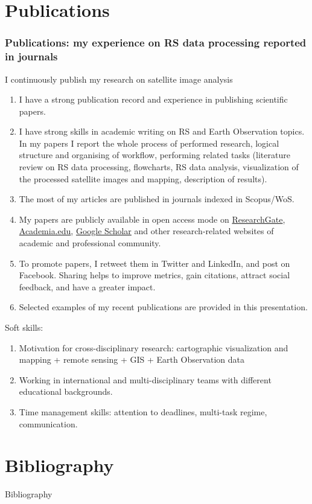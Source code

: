\documentclass[pdflatex,compress,8pt,
	xcolor={dvipsnames,dvipsnames,svgnames,x11names,table},
	hyperref={colorlinks = true,breaklinks = true, urlcolor = NavyBlue, breaklinks = true}]{beamer}
\begin{document}
\section{Publications}
\begin{frame}\frametitle{Publications: my experience on RS data processing reported in journals}

\begin{alertblock}{I continuously publish my research on satellite image analysis}
\small{\begin{enumerate}[\ding{213}]
	\item I have a strong publication record and experience in publishing scientific papers. 
	\item I have strong skills in academic writing on RS and Earth Observation topics. In my papers I report the whole process of performed research, logical structure and organising of workflow, performing related tasks (literature review on RS data processing, flowcharts, RS data analysis, visualization of the processed satellite images and mapping, description of results). 
	\item The most of my articles are published in journals indexed in \alert{Scopus/WoS}.
	\item My papers are publicly available in open access mode on \href{https://www.researchgate.net/profile/Polina-Lemenkova-2}{ResearchGate}, \href{https://ulb.academia.edu/PolinaLemenkova}{Academia.edu}, \href{https://scholar.google.com/citations?user=As7apVQAAAAJ&hl=en}{Google Scholar} and other research-related websites of academic and professional community. 
	\item To promote papers, I retweet them in Twitter and LinkedIn, and post on Facebook. Sharing helps to improve metrics, gain citations, attract social feedback, and have a greater impact. 
	\item Selected examples of my recent publications are provided in this presentation.
\end{enumerate}}
\end{alertblock}

\begin{block}{Soft skills:}
\small{\begin{enumerate}[\ding{91}]
	\item Motivation for cross-disciplinary research: cartographic visualization and mapping + remote sensing + GIS + Earth Observation data  
	\item Working in international and multi-disciplinary teams with different educational backgrounds.
	\item Time management skills: attention to deadlines, multi-task regime, communication.
\end{enumerate}}
\end{block}
\end{frame}


\section{Bibliography}
\Large{Bibliography}
\nocite{*}
%
%
\printbibliography[heading=none]
	
\end{document}
